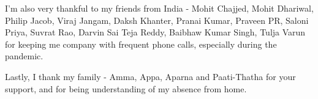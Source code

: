 \par
I'm also very thankful to my friends from India - Mohit Chajjed, Mohit Dhariwal, Philip Jacob, Viraj Jangam, Daksh Khanter, Pranai Kumar, Praveen PR, Saloni Priya, Suvrat Rao, Darvin Sai Teja Reddy, Baibhaw Kumar Singh, Tulja Varun for keeping me company with frequent phone calls, especially during the pandemic. 
\par
Lastly, I thank my family - Amma, Appa, Aparna and Paati-Thatha for your support, and for being understanding of my absence from home. 
\newpage
\thispagestyle{empty}